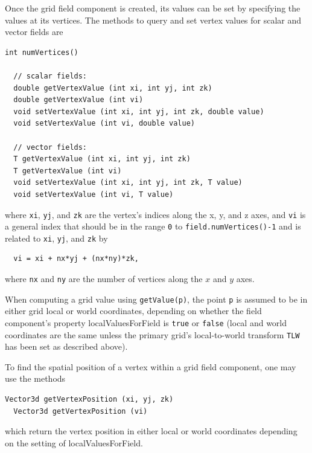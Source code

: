 Once the grid field component is created, its values can be set by
specifying the values at its vertices. The methods to 
query and set vertex values for scalar and vector fields are
%
\begin{lstlisting}[]
  int numVertices()

  // scalar fields:
  double getVertexValue (int xi, int yj, int zk)
  double getVertexValue (int vi)
  void setVertexValue (int xi, int yj, int zk, double value)
  void setVertexValue (int vi, double value)

  // vector fields:
  T getVertexValue (int xi, int yj, int zk)
  T getVertexValue (int vi)
  void setVertexValue (int xi, int yj, int zk, T value)
  void setVertexValue (int vi, T value)
\end{lstlisting}
%
where {\tt xi}, {\tt yj}, and {\tt zk} are the vertex's indices along
the x, y, and z axes, and {\tt vi} is a general index that should be
in the range {\tt 0} to {\tt field.numVertices()-1} and is related to
{\tt xi}, {\tt yj}, and {\tt zk} by
%
\begin{verbatim}
  vi = xi + nx*yj + (nx*ny)*zk,
\end{verbatim}
where {\tt nx} and {\tt ny} are the number of vertices along the $x$
and $y$ axes.

When computing a grid value using {\tt getValue(p)}, the point {\tt p}
is assumed to be in either grid local or world coordinates, depending
on whether the field component's property {\sf localValuesForField} is
{\tt true} or {\tt false} (local and world coordinates are the same
unless the primary grid's local-to-world transform {\tt TLW} has been
set as described above).

To find the spatial position of a vertex within a grid field
component, one may use the methods
%
\begin{lstlisting}[]
  Vector3d getVertexPosition (xi, yj, zk)
  Vector3d getVertexPosition (vi)
\end{lstlisting}
%
which return the vertex position in either local or world coordinates
depending on the setting of {\sf localValuesForField}.

